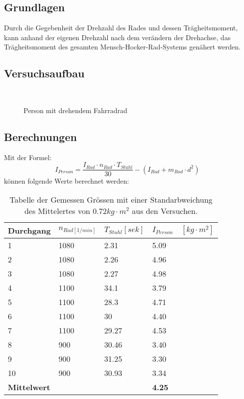 \documentclass{article}
\begin{document}
\subsection{Grundlagen}
Durch die Gegebenheit der Drehzahl des Rades und dessen Trägheitsmoment, kann anhand der eigenen
Drehzahl nach dem verändern der Drehachse, das Trägheitsmoment des gesamten 
Mensch-Hocker-Rad-Systems genähert werden.

\subsection{Versuchsaufbau}
\begin{figure}[h]
\center

\caption{Person mit drehendem Fahrradrad}
\

\end{figure}

\subsection{Berechnungen}
Mit der Formel:
\begin{equation}
I_{Person}=\frac{I_{Rad}\cdot n_{Rad}\cdot T_{Stuhl}}{30}-(I_{Rad}+m_{Rad}\cdot d^2)
\end{equation}
können folgende Werte berechnet werden:
\begin{table}[H]
   \center
    \begin{tabular}{|l|l|l|l|}
        \hline
     
        Durchgang & $n_{Rad[1/min]}$ & $T_{Stuhl}[sek]$ & $I_{Person}\quad [kg\cdot m^2]$ \\ \hline
        1         & 1080         & 2.31    & 5.09      \\ 
        2         & 1080         & 2.26    & 4.96       \\ 
        3         & 1080         & 2.27    & 4.98        \\ 
        4         & 1100         & 34.1    & 3.79        \\ 
        5         & 1100         & 28.3    & 4.71        \\ 
        6         & 1100         & 30      & 4.40        \\ 
        7         & 1100         & 29.27   & 4.53        \\ 
        8         & 900          & 30.46   & 3.40        \\ 
        9         & 900          & 31.25   & 3.30        \\ 
        10        & 900          & 30.93   & 3.34        \\ \hline
        	\textbf{Mittelwert}&&&\textbf{4.25}\\
        \hline
    \end{tabular}
    \caption{Tabelle der Gemessen Grössen mit einer Standarbweichung des Mittelertes von 0.72$ kg\cdot m^2$ aus den Versuchen.}
\end{table}
\end{document}
